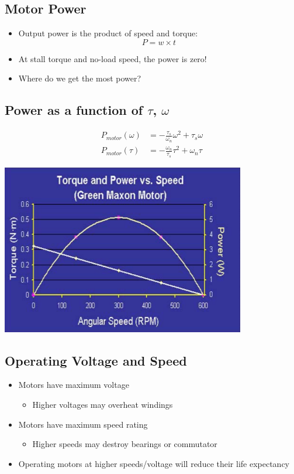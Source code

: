 \documentclass[10pt]{article}
\begin{document}
\subsection*{Motor Power}
\begin{itemize}
	\item Output power is the product of speed and torque:
	\[P = w \times t\]
    \item At stall torque and no-load speed, the power is zero!
    \item Where do we get the most power?
\end{itemize}

\subsection*{Power as a function of $\tau$, $\omega$}
\begin{align*}
    P_{motor}(\omega) &= -\frac{\tau_s}{\omega_n} \omega^2 + \tau_s \omega\\
    P_{motor}(\tau) &= -\frac{\omega_n}{\tau_s}\tau^2 + \omega_n \tau
\end{align*}
\begin{center} 
	\includegraphics*[width=0.8\textwidth]{L2_12.png} 
\end{center}

\subsection*{Operating Voltage and Speed}
\begin{itemize}
	\item Motors have maximum voltage
	\begin{itemize}
        \item Higher voltages may overheat windings
    \end{itemize}
	\item Motors have maximum speed rating
	\begin{itemize}
        \item Higher speeds may destroy bearings or commutator
    \end{itemize}
	\item Operating motors at higher speeds/voltage will reduce their life expectancy
\end{itemize}
\end{document}
